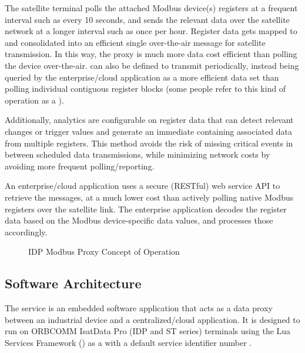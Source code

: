 \documentclass[letterpaper,10pt,english]{sphinxmanual}
\begin{document}
The satellite terminal polls the attached Modbus device(s) registers at a frequent interval such as every 10 seconds, and sends the relevant data over the satellite network at a longer interval such as once per hour.  Register data gets mapped to  and consolidated into an efficient single over-the-air  message for satellite transmission.  In this way, the proxy  is much more data cost efficient than polling the device over-the-air.   can also be defined to  transmit periodically, instead being queried by the enterprise/cloud application as a more efficient data set than polling individual contiguous register blocks (some people refer to this kind of operation as a ).

Additionally, analytics are configurable on register data that can detect relevant changes or trigger values and generate an immediate  containing associated data from multiple registers.  This method avoids the risk of missing critical events in between scheduled data transmissions, while minimizing network costs by avoiding more frequent polling/reporting.

An enterprise/cloud application uses a secure (RESTful) web service API to retrieve the messages, at a much lower cost than actively polling native Modbus registers over the satellite link.  The enterprise application decodes the register data based on the Modbus device-specific data values, and processes those accordingly.

\begin{figure}[htbp]
\centering
\capstart

\noindent{}
\caption{IDP Modbus Proxy Concept of Operation}\label{\detokenize{overview:id1}}\end{figure}


\subsection{Software Architecture}
\label{\detokenize{overview:software-architecture}}
The  service is an embedded software application that acts as a data proxy between an industrial device and a centralized/cloud application.  It is designed to run on ORBCOMM IsatData Pro (IDP and ST series) terminals using the Lua Services Framework () as a  with a default service identifier number .
\end{document}
